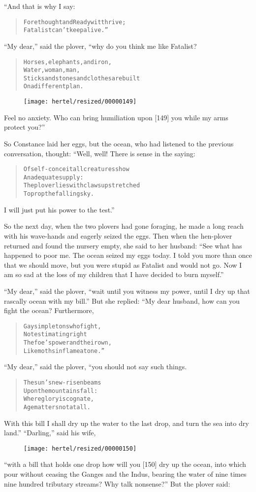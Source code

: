 \documentclass[article, twoside, 10pt]{memoir}
\renewenvironment{verbatim}{%
\begin{quote}%
\vskip -10pt%
\begin{alltt}\normalfont\small}{\end{alltt}%
\end{quote}%
\vskip -10pt
} %
\begin{document}
“And that is why I say:

\begin{verbatim}
Forethought and Readywit thrive;
Fatalist can't keep alive.”
\end{verbatim}
``My dear,'' said the plover, “why do you think me like Fatalist?

\begin{verbatim}
Horses, elephants, and iron,
Water, woman, man,
Sticks and stones and clothes are built
On a different plan.
\end{verbatim}
\begin{figure}[p]\texttt{[image: hertel/resized/00000149]}\end{figure}Feel no anxiety. Who can bring humiliation upon [149] you while my
arms protect you?”

So Constance laid her eggs, but the ocean, who had listened to the
previous conversation, thought: “Well, well! There is sense in the
saying:

\begin{verbatim}
Of self-conceit all creatures show
    An adequate supply:
The plover lies with claws upstretched
    To prop the falling sky.
\end{verbatim}
I will just put his power to the test.”

So the next day, when the two plovers had gone foraging, he made a
long reach with his wave-hands and eagerly seized the eggs. Then
when the hen-plover returned and found the nursery empty, she said
to her husband:
``See what has happened to poor me. The ocean seized my eggs today. I told you more than once that we should move, but you were stupid as Fatalist and would not go. Now I am so sad at the loss of my children that I have decided to burn myself.''

``My dear,'' said the plover,
``wait until you witness my power, until I dry up that rascally ocean with my bill.''
But she replied: “My dear husband, how can you fight the ocean?
Furthermore,

\begin{verbatim}
Gay simpletons who fight,
Not estimating right
The foe's power and their own,
Like moths in flame atone.”
\end{verbatim}
``My dear,'' said the plover, “you should not say such things.

\begin{verbatim}
The sun's new-risen beams
Upon the mountains fall:
Where glory is cognate,
Age matters not at all.
\end{verbatim}
With this bill I shall dry up the water to the last drop, and turn
the sea into dry land.” ``Darling,'' said his wife,
\begin{figure}[p]\texttt{[image: hertel/resized/00000150]}\end{figure}``with a bill that holds one drop how will you [150] dry up the ocean, into which pour without ceasing the Ganges and the Indus, bearing the water of nine times nine hundred tributary streams? Why talk nonsense?''
But the plover said:
\end{document}
